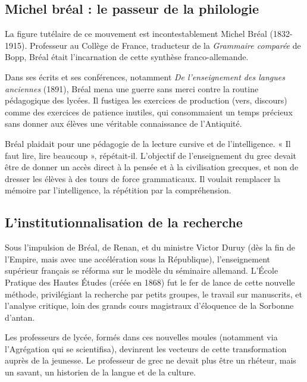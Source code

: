 \subsection{Michel bréal : le passeur de la philologie}

La figure tutélaire de ce mouvement est incontestablement Michel Bréal (1832-1915). Professeur au
Collège de France, traducteur de la \textit{Grammaire comparée} de Bopp, Bréal était l'incarnation
de cette synthèse franco-allemande.\cite{I-1-1-ref24}

Dans ses écrits et ses conférences, notamment \textit{De l'enseignement des langues anciennes}
(1891), Bréal mena une guerre sans merci contre la routine pédagogique des lycées.\cite{I-1-1-ref27}
Il fustigea les exercices de production (vers, discours) comme des \og exercices de patience\fg{}
inutiles, qui consommaient un temps précieux sans donner aux élèves une véritable connaissance de
l'Antiquité.

Bréal plaidait pour une pédagogie de la lecture cursive et de l'intelligence. « Il faut lire, lire
beaucoup », répétait-il. L'objectif de l'enseignement du grec devait être de donner un accès direct
à la pensée et à la civilisation grecques, et non de dresser les élèves à des tours de force
grammaticaux. Il voulait remplacer la mémoire par l'intelligence, la répétition par la
compréhension.\cite{I-1-1-ref28}



\subsection{L'institutionnalisation de la recherche}

Sous l'impulsion de Bréal, de Renan, et du ministre Victor Duruy (dès la fin de l'Empire, mais avec
une accélération sous la République), l'enseignement supérieur français se réforma sur le modèle du
séminaire allemand. L'École Pratique des Hautes Études (créée en 1868) fut le fer de lance de cette
nouvelle méthode, privilégiant la recherche par petits groupes, le travail sur manuscrits, et
l'analyse critique, loin des grands cours magistraux d'éloquence de la Sorbonne
d'antan.\cite{I-1-1-ref31}

Les professeurs de lycée, formés dans ces nouvelles moules (notamment via l'Agrégation qui se \og
scientifisa\fg{}), devinrent les vecteurs de cette transformation auprès de la jeunesse. Le
professeur de grec ne devait plus être un rhéteur, mais un savant, un historien de la langue et de
la culture.\cite{I-1-1-ref3}



